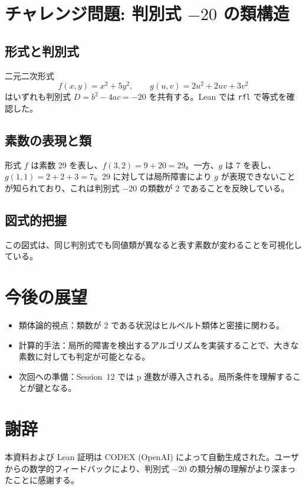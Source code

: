 \documentclass[a4paper]{ltjsarticle}
\begin{document}
\section{チャレンジ問題: 判別式 \(-20\) の類構造}
\subsection{形式と判別式}
二元二次形式
\[
f(x,y) = x^2 + 5y^2, \qquad g(u,v) = 2u^2 + 2uv + 3v^2
\]
はいずれも判別式 \(D = b^2 - 4ac = -20\) を共有する。Lean では \texttt{rfl} で等式を確認した。

\subsection{素数の表現と類}
形式 \(f\) は素数 29 を表し、\(f(3,2) = 9 + 20 = 29\)。一方、\(g\) は 7 を表し、\(g(1,1) = 2 + 2 + 3 = 7\)。29 に対しては局所障害により \(g\) が表現できないことが知られており、これは判別式 \(-20\) の類数が 2 であることを反映している。

\subsection{図式的把握}
\begin{center}
\end{center}

この図式は、同じ判別式でも同値類が異なると表す素数が変わることを可視化している。

\section{今後の展望}
\begin{itemize}
  \item 類体論的視点：類数が 2 である状況はヒルベルト類体と密接に関わる。
  \item 計算的手法：局所的障害を検出するアルゴリズムを実装することで、大きな素数に対しても判定が可能となる。
  \item 次回への準備：Session~12 では p 進数が導入される。局所条件を理解することが鍵となる。
\end{itemize}

\section*{謝辞}
本資料および Lean 証明は CODEX (OpenAI) によって自動生成された。ユーザからの数学的フィードバックにより、判別式 \(-20\) の類分解の理解がより深まったことに感謝する。
\end{document}
